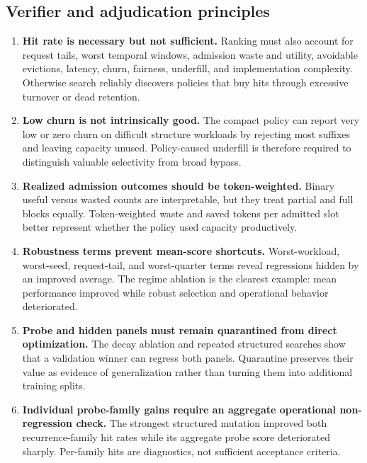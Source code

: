 \documentclass[11pt]{article}
\begin{document}
\subsection{Verifier and adjudication principles}

\begin{enumerate}
  \item \textbf{Hit rate is necessary but not sufficient.}  Ranking must also account
  for request tails, worst temporal windows, admission waste and utility, avoidable
  evictions, latency, churn, fairness, underfill, and implementation complexity.
  Otherwise search reliably discovers policies that buy hits through excessive
  turnover or dead retention.

  \item \textbf{Low churn is not intrinsically good.}  The compact policy can report
  very low or zero churn on difficult structure workloads by rejecting most suffixes
  and leaving capacity unused.  Policy-caused underfill is therefore required to
  distinguish valuable selectivity from broad bypass.

  \item \textbf{Realized admission outcomes should be token-weighted.}  Binary useful
  versus wasted counts are interpretable, but they treat partial and full blocks
  equally.  Token-weighted waste and saved tokens per admitted slot better represent
  whether the policy used capacity productively.

  \item \textbf{Robustness terms prevent mean-score shortcuts.}  Worst-workload,
  worst-seed, request-tail, and worst-quarter terms reveal regressions hidden by an
  improved average.  The regime ablation is the clearest example: mean performance
  improved while robust selection and operational behavior deteriorated.

  \item \textbf{Probe and hidden panels must remain quarantined from direct
  optimization.}  The decay ablation and repeated structured searches show that a
  validation winner can regress both panels.  Quarantine preserves their value as
  evidence of generalization rather than turning them into additional training splits.

  \item \textbf{Individual probe-family gains require an aggregate operational
  non-regression check.}  The strongest structured mutation improved both
  recurrence-family hit rates while its aggregate probe score deteriorated sharply.
  Per-family hits are diagnostics, not sufficient acceptance criteria.


\end{enumerate}
\end{document}
